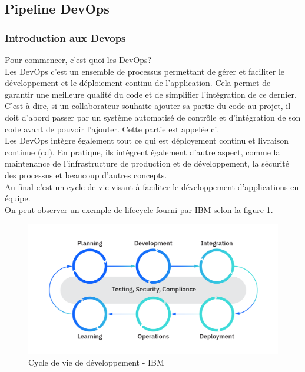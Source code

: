 \documentclass[
    iai, %
    il, %
]{heig-tb}
\begin{document}

\clearpage
\subsection{Pipeline DevOps}
\subsubsection{Introduction aux Devops}
Pour commencer, c'est quoi les DevOps?\\
Les DevOps c'est un ensemble de processus permettant de gérer et faciliter le développement et le déploiement continu de l'application. Cela permet de garantir une meilleure qualité du code et de simplifier l'intégration de ce dernier. C'est-à-dire, si un collaborateur souhaite ajouter sa partie du code au projet, il doit d'abord passer par un système automatisé de contrôle et d'intégration de son code avant de pouvoir l'ajouter. Cette partie est appelée \Gls{ci}.\\
Les DevOps intègre également tout ce qui est déployement continu et livraison continue (\Gls{cd}).
En pratique, ils intègrent également d'autre aspect, comme la maintenance de l'infrastructure de
production et de développement, la sécurité des processus et beaucoup d'autres concepts.\\
Au final c'est un cycle de vie visant à faciliter le développement d'applications en équipe.\\
On peut observer un exemple de lifecycle fourni par IBM selon la figure \ref{devops-lifecycle}.

\begin{center}
    \begin{figure}
        \includegraphics[width=\textwidth]{./assets/figures/ibm-devops-lifecycle.png}
        \caption[Cycle de vie de développement]{Cycle de vie de développement - IBM} \label{devops-lifecycle}
    \end{figure}
\end{center}
\end{document}
